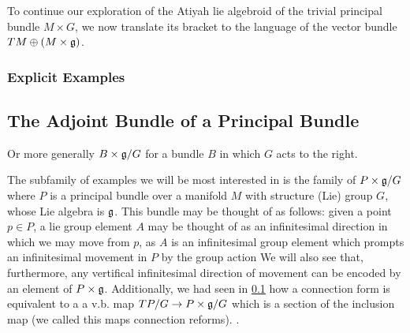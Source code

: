 To continue our exploration of the Atiyah lie algebroid of the trivial principal bundle $M \times G$, we now translate its bracket to the language of the vector bundle $TM \oplus (M \times \mathfrak{g})$. 

\subsubsection{Explicit Examples}



\subsection{The Adjoint Bundle of a Principal Bundle}

Or more generally $B \times \mathfrak{g} / G$ for a bundle $B$ in which $G$ acts to the right.

The subfamily of examples we will be most interested in is the family of $P \times \mathfrak{g}/G$ where $P$ is a principal bundle over a manifold $M$ with structure (Lie) group $G$, whose Lie  algebra is $\mathfrak{g}$. This bundle may be thought of as follows: given a point $p \in P$, a lie group element $A$ may be thought of as an infinitesimal direction in which we may move from $p$, as $A$ is an infinitesimal group element which prompts an infinitesimal movement in $P$ by the group action We will also see that, furthermore, any vertifical infinitesimal direction of movement can be encoded by an element of $P \times \mathfrak{g}$. Additionally, we had seen in \ref{} how a connection form is equivalent to a  a v.b. map $TP/G \to P \times \mathfrak{g}/G$ which is a section of the inclusion map (we called this maps connection reforms). .


